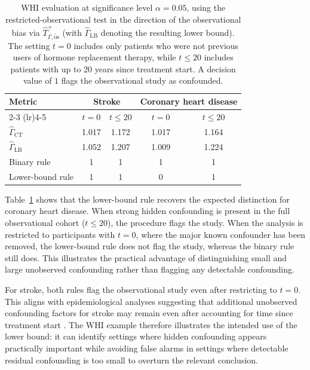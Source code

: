 \begin{table}[!t]
\centering
\caption{WHI evaluation at significance level \(\alpha=0.05\), using the restricted-observational test in the direction of the observational bias via \(\widehat{T}^+_{\Gamma,\widetilde{\mathrm{os}}}\) (with \(\widehat{\Gamma}_{\mathrm{LB}}\) denoting the resulting lower bound). The setting \(t=0\) includes only patients who were not previous users of hormone replacement therapy, while \(t\leq 20\) includes patients with up to 20 years since treatment start. A decision value of \(1\) flags the observational study as confounded.}
\label{tab:confounding-whi}
\begin{tabular}{lcccc}
\toprule
\multirow{2}{*}{Metric} & \multicolumn{2}{c}{Stroke} & \multicolumn{2}{c}{Coronary heart disease} \\
\cmidrule(lr){2-3} \cmidrule(lr){4-5}
& \(t=0\) & \(t\leq 20\) & \(t=0\) & \(t\leq 20\) \\
\midrule
\(\widehat{\Gamma}_{\mathrm{CT}}\) & 1.017 & 1.172 & 1.017 & 1.164 \\
\(\widehat{\Gamma}_{\mathrm{LB}}\) & 1.052 & 1.207 & 1.009 & 1.224 \\
\midrule
Binary rule & 1 & 1 & 1 & 1 \\
Lower-bound rule & 1 & 1 & 0 & 1 \\
\bottomrule
\end{tabular}
\end{table}

Table~\ref{tab:confounding-whi} shows that the lower-bound rule recovers the expected distinction for coronary heart disease. When strong hidden confounding is present in the full observational cohort (\(t\leq 20\)), the procedure flags the study. When the analysis is restricted to participants with \(t=0\), where the major known confounder has been removed, the lower-bound rule does not flag the study, whereas the binary rule still does. This illustrates the practical advantage of distinguishing small and large unobserved confounding rather than flagging any detectable confounding.

For stroke, both rules flag the observational study even after restricting to \(t=0\). This aligns with epidemiological analyses suggesting that additional unobserved confounding factors for stroke may remain even after accounting for time since treatment start \citep{prentice2005combined}. The WHI example therefore illustrates the intended use of the lower bound: it can identify settings where hidden confounding appears practically important while avoiding false alarms in settings where detectable residual confounding is too small to overturn the relevant conclusion.

